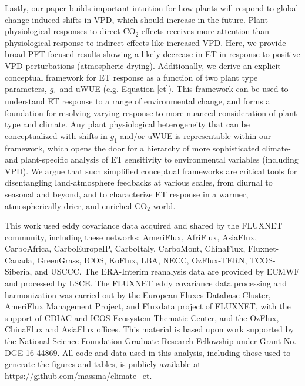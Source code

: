 \documentclass[draft,linenumbers]{agujournal}
\begin{document}
Lastly, our paper builds important intuition for how plants will respond to global change-induced shifts in VPD, which should increase in the future. Plant physiological responses to direct CO$_2$ effects \citep[e.g.,][]{Swann_2016} receives more attention than physiological response to indirect effects like increased VPD. Here, we provide broad PFT-focused results showing a likely decrease in ET in response to positive VPD perturbations (atmospheric drying). Additionally, we derive an explicit conceptual framework for ET response as a function of two plant type parameters, $g_1$ and uWUE (e.g. Equation \ref{et}). This framework can be used to understand ET response to a range of environmental change, and forms a foundation for resolving varying response to more nuanced consideration of plant type and climate. Any plant physiological heterogeneity that can be conceptualized with shifts in $g_1$ \citep[e.g.][]{Lin_2015} and/or uWUE \citep[e.g.][]{Zhou_2014} is representable within our framework, which opens the door for a hierarchy of more sophisticated climate- and plant-specific analysis of ET sensitivity to environmental variables (including VPD). We argue that such simplified conceptual frameworks are critical tools for disentangling land-atmosphere feedbacks at various scales, from diurnal to seasonal and beyond, and to characterize ET response in a warmer, atmospherically drier, and enriched CO$_2$ world. 


\acknowledgments
This work used eddy covariance data acquired and shared by the FLUXNET community, including these networks: AmeriFlux, AfriFlux, AsiaFlux, CarboAfrica, CarboEuropeIP, CarboItaly, CarboMont, ChinaFlux, Fluxnet-Canada, GreenGrass, ICOS, KoFlux, LBA, NECC, OzFlux-TERN, TCOS-Siberia, and USCCC. The ERA-Interim reanalysis data are provided by ECMWF and processed by LSCE. The FLUXNET eddy covariance data processing and harmonization was carried out by the European Fluxes Database Cluster, AmeriFlux Management Project, and Fluxdata project of FLUXNET, with the support of CDIAC and ICOS Ecosystem Thematic Center, and the OzFlux, ChinaFlux and AsiaFlux offices. This material is based upon work supported by the National Science Foundation Graduate Research Fellowship under Grant No. DGE 16-44869. All code and data used in this analysis, including those used to generate the figures and tables, is publicly available at https://github.com/massma/climate\_et.



\end{document}
